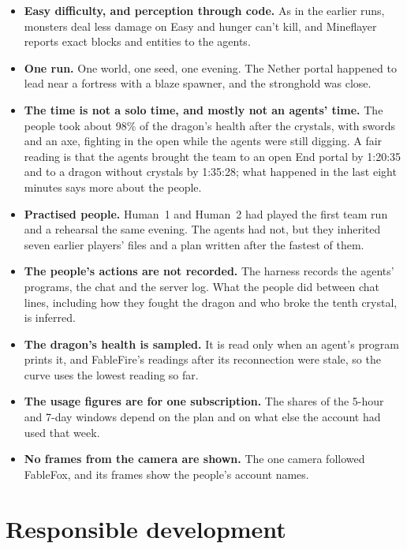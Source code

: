 \documentclass[11pt,a4paper]{article}
\begin{document}
\begin{itemize}
  \item \textbf{Easy difficulty, and perception through code.} As in the earlier runs, monsters deal less damage on Easy and hunger can't kill, and Mineflayer reports exact blocks and entities to the agents.
  \item \textbf{One run.} One world, one seed, one evening. The Nether portal happened to lead near a fortress with a blaze spawner, and the stronghold was close.
  \item \textbf{The time is not a solo time, and mostly not an agents' time.} The people took about 98\% of the dragon's health after the crystals, with swords and an axe, fighting in the open while the agents were still digging. A fair reading is that the agents brought the team to an open End portal by 1:20:35 and to a dragon without crystals by 1:35:28; what happened in the last eight minutes says more about the people.
  \item \textbf{Practised people.} Human~1 and Human~2 had played the first team run and a rehearsal the same evening. The agents had not, but they inherited seven earlier players' files and a plan written after the fastest of them.
  \item \textbf{The people's actions are not recorded.} The harness records the agents' programs, the chat and the server log. What the people did between chat lines, including how they fought the dragon and who broke the tenth crystal, is inferred.
  \item \textbf{The dragon's health is sampled.} It is read only when an agent's program prints it, and FableFire's readings after its reconnection were stale, so the curve uses the lowest reading so far.
  \item \textbf{The usage figures are for one subscription.} The shares of the 5-hour and 7-day windows depend on the plan and on what else the account had used that week.
  \item \textbf{No frames from the camera are shown.} The one camera followed FableFox, and its frames show the people's account names.
\end{itemize}

\section{Responsible development}
\end{document}
